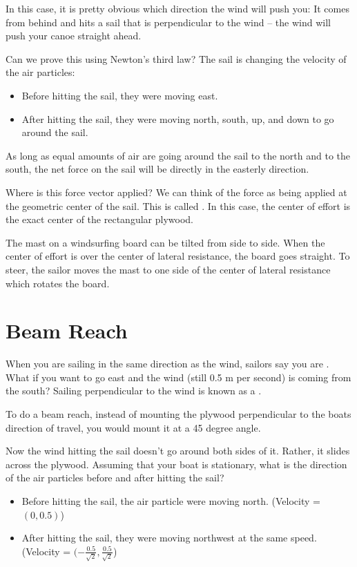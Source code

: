 In this case,  it is pretty obvious which direction the wind will push you: It comes from behind and hits a sail that is perpendicular to the wind -- the wind will
push your canoe straight ahead. 

Can we prove this using Newton's third law?  The sail is changing the velocity of the air particles:

\begin{itemize}
\item Before hitting the sail,  they were moving east.
\item After hitting the sail,  they were moving north, south, up, and down to go around the sail.  
\end{itemize}

 As long as equal amounts of air are going around the sail to the north and to the south,   the net force on the sail will be directly in the easterly direction.
 
Where is this force vector applied?  We can think of the force as being applied at the geometric center of the sail.  This is called .   In this case,  the center of effort is the exact center of the rectangular plywood.

The mast on a windsurfing board can be tilted from side to side.  When the center of effort is over the center of lateral resistance,  the board goes straight.
To steer,   the sailor moves the mast to one side of the center of lateral resistance which rotates the board.

\section{Beam Reach}

When you are sailing in the same direction as the wind,  sailors say you are .   What if you want to go east and the wind (still 0.5 m per second) is coming from the south?  Sailing perpendicular to the wind is known as a .

To do a beam reach,  instead of mounting the plywood perpendicular to the boats direction of travel,  you would mount it at a 45 degree angle.

Now the wind hitting the sail doesn't go around both sides of it.  Rather,  it slides across the plywood.   Assuming that your boat is stationary,  what is the
direction of the air particles before and after hitting the sail?

\begin{itemize}
\item Before hitting the sail,  the air particle were moving north. (Velocity = $(0,0.5)$)
\item After hitting the sail,  they were moving northwest at the same speed.  (Velocity = $(-\frac{0.5}{\sqrt{2}}, \frac{0.5}{\sqrt{2}}$)
\end{itemize}

